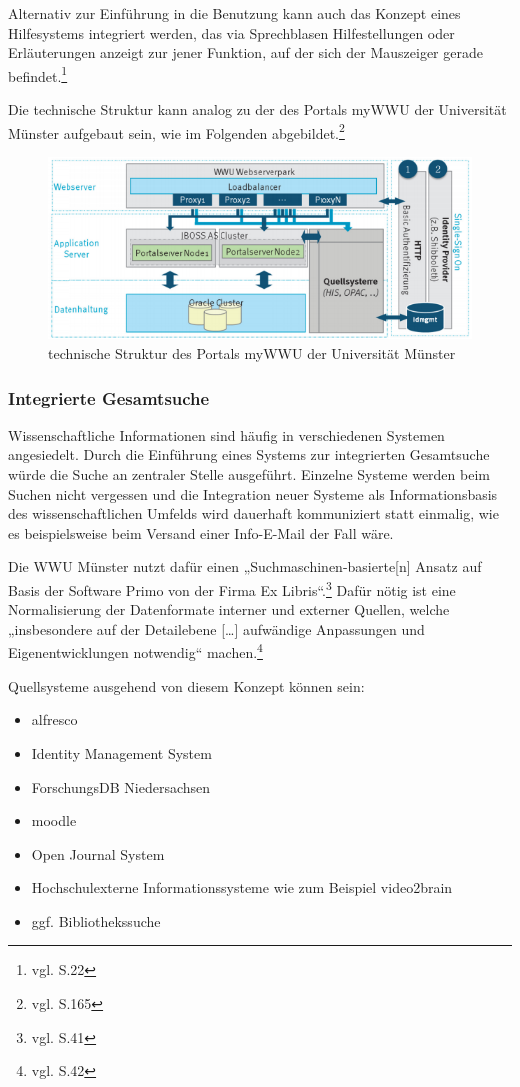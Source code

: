 Alternativ zur Einführung in die Benutzung kann auch das Konzept eines Hilfesystems integriert werden, das via Sprechblasen Hilfestellungen oder Erläuterungen anzeigt zur jener Funktion, auf der sich der Mauszeiger gerade befindet.\footnote{vgl. \cite{vogl_bericht_2013} S.22}

Die technische Struktur kann analog zu der des Portals myWWU der Universität Münster aufgebaut sein, wie im Folgenden abgebildet.\footnote{vgl. \cite{vogl_fortschritte_2012} S.165}
\begin{figure}[h!]
	\centering
	\includegraphics[width=\textwidth]{kapitel/gruppe3/bilder/struktur_mywwu}
	\caption{technische Struktur des Portals myWWU der Universität Münster}
	\label{fig_struktur_mywwu}
\end{figure}
\newpage

\subsubsection{Integrierte Gesamtsuche}
Wissenschaftliche Informationen sind häufig in verschiedenen Systemen angesiedelt. 
Durch die Einführung eines Systems zur integrierten Gesamtsuche würde die Suche 
an zentraler Stelle ausgeführt. Einzelne Systeme werden beim Suchen nicht vergessen 
und die Integration neuer Systeme als Informationsbasis des wissenschaftlichen 
Umfelds wird dauerhaft kommuniziert statt einmalig, wie es beispielsweise beim 
Versand einer Info-E-Mail der Fall wäre.

Die WWU Münster nutzt dafür einen „Suchmaschinen-basierte[n] Ansatz auf Basis der Software Primo von der Firma Ex Libris“.\footnote{vgl. \cite{vogl_fortschritte_2012} S.41} Dafür nötig ist eine Normalisierung der Datenformate interner und externer Quellen, welche „insbesondere auf der Detailebene […] aufwändige Anpassungen und Eigenentwicklungen notwendig“ machen.\footnote{vgl. \cite{vogl_fortschritte_2012} S.42} 

Quellsysteme ausgehend von diesem Konzept können sein:
\begin{itemize}
	\item alfresco
	\item Identity Management System
	\item ForschungsDB Niedersachsen
	\item moodle
	\item Open Journal System
	\item Hochschulexterne Informationssysteme wie zum Beispiel video2brain
	\item ggf. Bibliothekssuche
\end{itemize}

